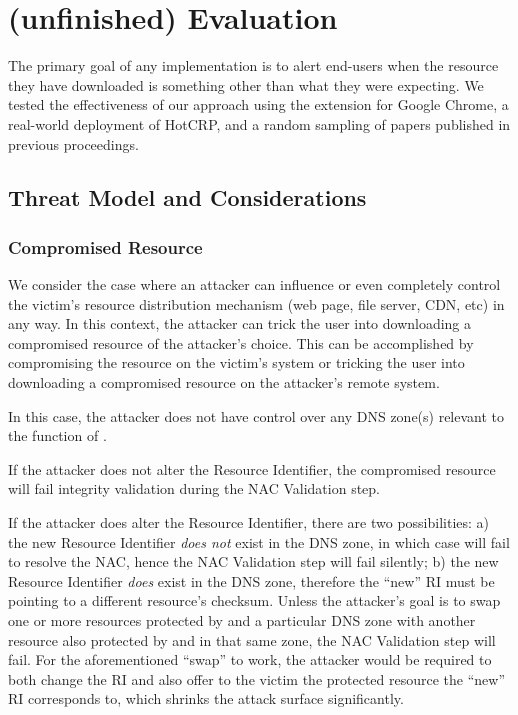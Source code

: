 \section{(unfinished) Evaluation} \label{sec:evaluation}

The primary goal of any \SYSTEM{} implementation is to alert end-users when the
resource they have downloaded is something other than what they were expecting.
We tested the effectiveness of our approach using the \SYSTEM{} extension for
Google Chrome, a real-world deployment of HotCRP, and a random sampling of
papers published in previous \CONFERENCE{} proceedings.

\subsection{Threat Model and Considerations}

\subsubsection{Compromised Resource}

We consider the case where an attacker can influence or even completely control
the victim's resource distribution mechanism (web page, file server, CDN, etc)
in any way. In this context, the attacker can trick the user into downloading a
compromised resource of the attacker's choice. This can be accomplished by
compromising the resource on the victim's system or tricking the user into
downloading a compromised resource on the attacker's remote system.

In this case, the attacker does not have control over any DNS zone(s) relevant
to the function of \SYSTEM{}.

If the attacker does not alter the Resource Identifier, the compromised
resource will fail integrity validation during the NAC Validation step.

If the attacker does alter the Resource Identifier, there are two
possibilities: a) the new Resource Identifier \textit{does not} exist in the DNS
zone, in which case \SYSTEM{} will fail to resolve the NAC, hence the NAC
Validation step will fail silently; b) the new Resource Identifier \textit{does}
exist in the DNS zone, therefore the ``new'' RI must be pointing to a different
resource's checksum. Unless the attacker's goal is to swap one or more
resources protected by \SYSTEM{} and a particular DNS zone with another resource
also protected by \SYSTEM{} and in that same zone, the NAC Validation step will
fail. For the aforementioned ``swap'' to work, the attacker would be required
to both change the RI and also offer to the victim the \SYSTEM{} protected
resource the ``new'' RI corresponds to, which shrinks the attack surface
significantly.

